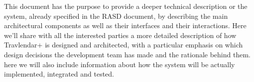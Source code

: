 This document has the purpose to provide a deeper technical description or the system, already specified in the RASD document, by describing the main architectural components as well as their interfaces and their interactions. Here we'll share with all the interested parties a more detailed description of how Travlendar+ is designed and architected, with a particular emphasis on which design decisions the development team has made and the rationale behind them.
here we will also include information about how the system will be actually implemented, integrated and tested.